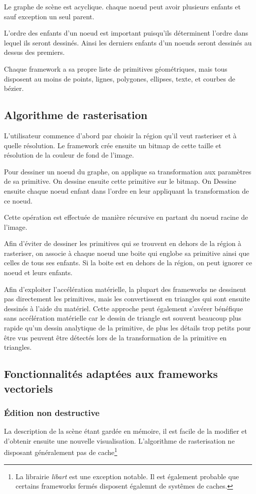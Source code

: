 			Le graphe de scène est acyclique. chaque noeud peut avoir plusieurs enfants et sauf exception un seul parent. 

			L'ordre des enfants d'un noeud est important puisqu'ils déterminent l'ordre dans lequel ils seront dessinés. Ainsi les derniers
			enfants d'un noeuds seront dessinés au dessus des premiers. 

			Chaque framework a sa propre liste de primitives géométriques, mais tous disposent au moins de points, lignes, polygones, ellipses,
			texte, et courbes de bézier.

		\subsection{Algorithme de rasterisation}
			L'utilisateur commence d'abord par choisir la région qu'il veut rasteriser et à quelle résolution. Le framework crée ensuite un bitmap
			de cette taille et résolution de la couleur de fond de l'image.

			Pour dessiner un noeud du graphe, on applique sa transformation aux paramètres de sa primitive. On dessine ensuite cette 
			primitive sur le bitmap. On Dessine ensuite chaque noeud enfant dans l'ordre en leur appliquant la transformation de ce noeud.

			Cette opération est effectuée de manière récursive en partant du noeud racine de l'image.

			Afin d'éviter de dessiner les primitives qui se trouvent en dehors de la région à rasteriser, on associe à chaque noeud une boite
			qui englobe sa primitive ainsi que celles de tous ses enfants. Si la boite est en dehors de la région, on peut ignorer ce noeud et
			leurs enfants. 

			Afin d'exploiter l'accélération matérielle, la plupart des frameworks ne dessinent pas directement les primitives, mais les 
			convertissent en triangles qui sont ensuite dessinés à l'aide du matériel. Cette approche peut également s'avérer bénéfique 
			sans accélération matérielle car le dessin de triangle est souvent beaucoup plus rapide qu'un dessin analytique de la primitive,
			de plus les détails trop petits pour être vus peuvent être détectés lors de la transformation de la primitive en triangles.

		\subsection{Fonctionnalités adaptées aux frameworks vectoriels}
			\subsubsection{Édition non destructive}
				La description de la scène étant gardée en mémoire, il est facile de la modifier et d'obtenir ensuite une nouvelle visualisation.
				L'algorithme de rasterisation ne disposant généralement pas de cache\footnote{La librairie \emph{libart} est une exception notable. Il est également probable que certains frameworks fermés disposent égalemnt de systêmes de caches.}
			
